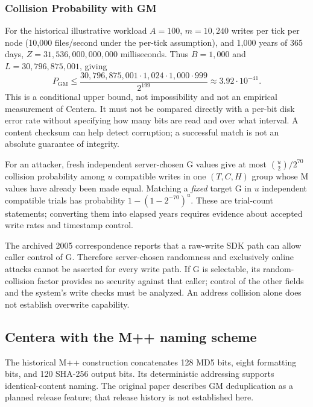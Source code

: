 \subsubsection{Collision Probability with GM}\label{sec:5.4.3}

For the historical illustrative workload $A=100$, $m=10{,}240$ writes per
tick per node (10,000 files/second under the per-tick assumption), and
1,000 years of 365 days, $Z=31{,}536{,}000{,}000{,}000$ milliseconds.
Thus $B=1{,}000$ and $L=30{,}796{,}875{,}001$, giving
\begin{equation}\label{eq:5.8}
P_{\mathrm{GM}}\le
\frac{30{,}796{,}875{,}001\cdot1{,}024\cdot1{,}000\cdot999}{2^{199}}
\approx3.92\cdot10^{-41}.
\end{equation}
This is a conditional upper bound, not impossibility and not an empirical
measurement of Centera. It must not be compared directly with a per-bit disk
error rate without specifying how many bits are read and over what interval.
A content checksum can help detect corruption; a successful match is not an
absolute guarantee of integrity.

For an attacker, fresh independent server-chosen G values give at most
$\binom u2/2^{70}$ collision probability among $u$ compatible writes in one
$(T,C,H)$ group whose M values have already been made equal. Matching a
\emph{fixed} target G in $u$ independent compatible trials has probability
$1-(1-2^{-70})^u$. These are trial-count statements; converting them into
elapsed years requires evidence about accepted write rates and timestamp
control.

The archived 2005 correspondence reports that a raw-write SDK path can allow
caller control of G. Therefore server-chosen randomness and exclusively
online attacks cannot be asserted for every write path. If G is selectable,
its random-collision factor provides no security against that caller;
control of the other fields and the system's write checks must be analyzed.
An address collision alone does not establish overwrite capability.

\subsection{Centera with the M++ naming
scheme}\label{sec:5.5}\label{centera-with-the-m-naming-scheme-1}

The historical M++ construction concatenates 128 MD5 bits, eight formatting
bits, and 120 SHA-256 output bits. Its deterministic addressing supports
identical-content naming. The original paper describes GM deduplication as
a planned release feature; that release history is not established here.

